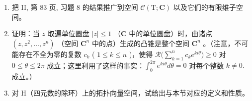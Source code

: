 \exercisegroup

\begin{enumerate}
\def\labelenumi{\arabic{enumi})}
\item
  把 II, 第 83 页, 习题 8 的结果推广到空间 \(\mathcal{C}(\mathrm{T};\mathbf{C})\) 以及它们的有限维子空间。
\item
  证明：当 \(z\) 取遍单位圆盘 \(|z| \leqslant 1\) （\(\mathbf{C}\) 中的单位圆盘）时，由诸点 \((z, z^2, \dots, z^n)\) （空间 \(\mathbf{C}^n\) 中的点）生成的凸锥是整个空间 \(\mathbf{C}^n\) 。（注意，不可能存在不全为零的复数 \(c_k\) ( \(1 \leqslant k \leqslant n\) )，使得 \(\mathcal{R}\big(\sum_{k=1}^{n} c_k e^{ki\theta}\big) \geqslant 0\) 对 \(0 \leqslant \theta \leqslant 2\pi\) 成立；这里利用了这样的事实：\(\int_0^{2\pi}e^{ki\theta}d\theta = 0\) 对每个整数 \(k\neq 0.\) 成立。）
\item
  对 H（四元数的除环）上的拓扑向量空间，试给出与本节对应的定义和性质。
\end{enumerate}

